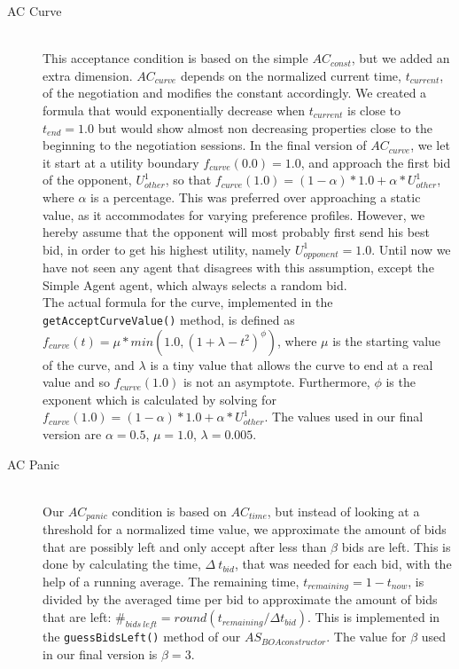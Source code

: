 \begin{description}
  \item[AC Curve] \hfill \\
This acceptance condition is based on the simple $AC_{const}$\cite{baarslag2013acceptance}, but we added an extra dimension. $AC_{curve}$ depends on the normalized current time, $t_{current}$, of the negotiation and modifies the constant accordingly. We created a formula that would exponentially decrease when $t_{current}$ is close to $t_{end} = 1.0$ but would show almost non decreasing properties close to the beginning to the negotiation sessions. In the final version of $AC_{curve}$, we let it start at a utility boundary $f_{curve}(0.0) = 1.0$, and approach the first bid of the opponent, $U_{other}^{1}$, so that $f_{curve}(1.0) = (1 - \alpha) * 1.0 + \alpha * U_{other}^{1}$, where $\alpha$ is a percentage. This was preferred over approaching a static value, as it accommodates for varying preference profiles. However, we hereby assume that the opponent will most probably first send his best bid, in order to get his highest utility, namely $U_{opponent}^{1} = 1.0$. Until now we have not seen any agent that disagrees with this assumption, except the Simple Agent agent, which always selects a random bid. \\

The actual formula for the curve, implemented in the \texttt{getAcceptCurveValue()} method, is defined as $f_{curve}(t) = \mu * min(1.0, (1 + \lambda - t^2)^{\phi})$, where $\mu$ is the starting value of the curve, and $\lambda$ is a tiny value that allows the curve to end at a real value and so $f_{curve}(1.0)$ is not an asymptote. Furthermore, $\phi$ is the exponent which is calculated by solving for $f_{curve}(1.0) = (1 - \alpha) * 1.0 + \alpha * U_{other}^{1}$. The values used in our final version are $\alpha = 0.5$, $\mu = 1.0$, $\lambda = 0.005$.

  \item[AC Panic] \hfill \\
Our $AC_{panic}$ condition is based on $AC_{time}$\cite{baarslag2013acceptance}, but instead of looking at a threshold for a normalized time value, we approximate the amount of bids that are possibly left and only accept after less than $\beta$ bids are left. This is done by calculating the time, $\Delta~t_{bid}$, that was needed for each bid, with the help of a running average. The remaining time, $t_{remaining} = 1 - t_{now}$, is divided by the averaged time per bid to approximate the amount of bids that are left: $\#_{bids~left} = round(t_{remaining} / \Delta t_{bid})$. This is implemented in the \texttt{guessBidsLeft()} method of our $AS_{BOAconstructor}$. The value for $\beta$ used in our final version is $\beta = 3$.\\


\end{description}
